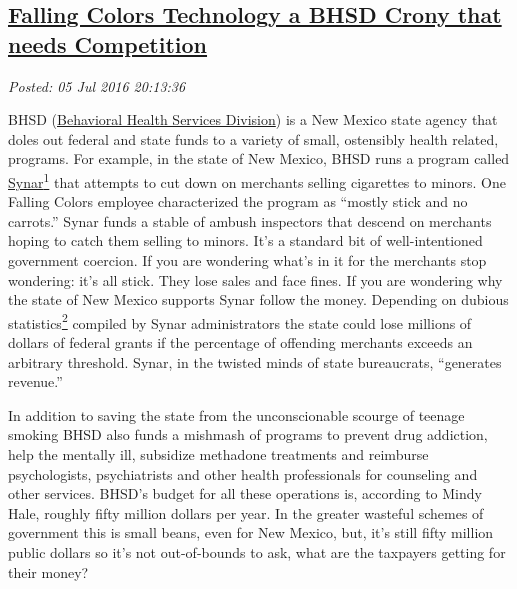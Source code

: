 

\subsection*{\href{https://analyzethedatanotthedrivel.org/2016/07/05/falling-colors-technology-a-bhsd-crony-that-needs-competition/}{Falling Colors Technology a BHSD Crony that needs Competition}}


\noindent\emph{Posted: 05 Jul 2016 20:13:36}
\vspace{6pt}

BHSD
(\href{http://www.hsd.state.nm.us/Behavioral_health_services_division.aspx}{Behavioral
Health Services Division}) is a New Mexico state agency that doles out
federal and state funds to a variety of small, ostensibly health
related, programs. For example, in the state of New Mexico, BHSD runs a
program called
\href{http://www.samhsa.gov/synar/about}{Synar}\protect\hyperlink{fn1}{\textsuperscript{1}}
that attempts to cut down on merchants selling cigarettes to minors. One
Falling Colors employee characterized the program as ``mostly stick and
no carrots.'' Synar funds a stable of ambush inspectors that descend on
merchants hoping to catch them selling to minors. It's a standard bit of
well-intentioned government coercion. If you are wondering what's in it
for the merchants stop wondering: it's all stick. They lose sales and
face fines. If you are wondering why the state of New Mexico supports
Synar follow the money. Depending on dubious
statistics\protect\hyperlink{fn2}{\textsuperscript{2}} compiled by Synar
administrators the state could lose millions of dollars of federal
grants if the percentage of offending merchants exceeds an arbitrary
threshold. Synar, in the twisted minds of state bureaucrats, ``generates
revenue.''

In addition to saving the state from the unconscionable scourge of
teenage smoking BHSD also funds a mishmash of programs to prevent drug
addiction, help the mentally ill, subsidize methadone treatments and
reimburse psychologists, psychiatrists and other health professionals
for counseling and other services. BHSD's budget for all these
operations is, according to Mindy Hale, roughly fifty million dollars
per year. In the greater wasteful schemes of government this is small
beans, even for New Mexico, but, it's still fifty million public dollars
so it's not out-of-bounds to ask, what are the taxpayers getting for
their money?

